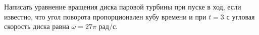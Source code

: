 Написать уравнение вращения диска паровой турбины при пуске в ход, если
известно, что угол поворота пропорционален кубу времени и при $t=3$ с
угловая скорость диска равна $\omega=27\pi$ рад/с.
